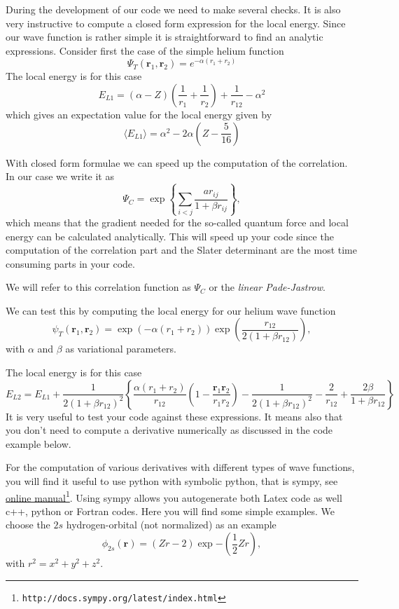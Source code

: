 \documentclass[graybox,sectrefs,envcountresetchap,open=right]{svmonodo}
\begin{document}
During the development of our code we need to make several checks. It is also very instructive to compute a closed form expression for the local energy. Since our wave function is rather simple  it is straightforward
to find an analytic expressions.  Consider first the case of the simple helium function 
\[
   \Psi_T(\bm{r}_1,\bm{r}_2) = e^{-\alpha(r_1+r_2)}
\]
The local energy is for this case 
\[ 
E_{L1} = \left(\alpha-Z\right)\left(\frac{1}{r_1}+\frac{1}{r_2}\right)+\frac{1}{r_{12}}-\alpha^2
\]
which gives an expectation value for the local energy given by
\[
\langle E_{L1} \rangle = \alpha^2-2\alpha\left(Z-\frac{5}{16}\right)
\]



With closed form formulae we  can speed up the computation of the correlation. In our case
we write it as 
\[
\Psi_C= \exp{\left\{\sum_{i < j}\frac{ar_{ij}}{1+\beta r_{ij}}\right\}},
\]
which means that the gradient needed for the so-called quantum force and local energy 
can be calculated analytically.
This will speed up your code since the computation of the correlation part and the Slater determinant are the most 
time consuming parts in your code.  

We will refer to this correlation function as $\Psi_C$ or the \emph{linear Pade-Jastrow}.




We can test this by computing the local energy for our helium wave function
\[
   \psi_{T}(\bm{r}_1,\bm{r}_2) = 
   \exp{\left(-\alpha(r_1+r_2)\right)}
   \exp{\left(\frac{r_{12}}{2(1+\beta r_{12})}\right)}, 
\]
with $\alpha$ and $\beta$ as variational parameters.

The local energy is for this case 
\[ 
E_{L2} = E_{L1}+\frac{1}{2(1+\beta r_{12})^2}\left\{\frac{\alpha(r_1+r_2)}{r_{12}}(1-\frac{\bm{r}_1\bm{r}_2}{r_1r_2})-\frac{1}{2(1+\beta r_{12})^2}-\frac{2}{r_{12}}+\frac{2\beta}{1+\beta r_{12}}\right\}
\]
It is very useful to test your code against these expressions. It means also that you don't need to
compute a derivative numerically as discussed in the code example below. 



For the computation of various derivatives with different types of wave functions, you will find it useful to use python with symbolic python, that is sympy, see \href{{http://docs.sympy.org/latest/index.html}}{online manual}\footnote{\texttt{http://docs.sympy.org/latest/index.html}}.  Using sympy allows you autogenerate both Latex code as well c++, python or Fortran codes. Here you will find some simple examples. We choose 
the $2s$ hydrogen-orbital  (not normalized) as an example
\[
 \phi_{2s}(\bm{r}) = (Zr - 2)\exp{-(\frac{1}{2}Zr)},
\]
with $ r^2 = x^2 + y^2 + z^2$.
\end{document}
